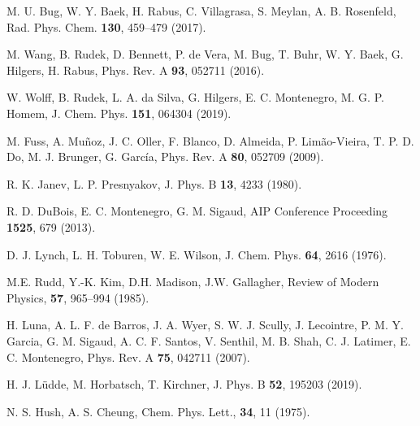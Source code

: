 \begin{thebibliography}{9}
M. U. Bug, W. Y. Baek, H. Rabus, C. Villagrasa, S. Meylan, A. B. Rosenfeld,
Rad. Phys. Chem. \textbf{130}, 459--479 (2017).

M. Wang, B. Rudek, D. Bennett, P. de Vera, M. Bug, T. Buhr, W. Y. Baek, 
G. Hilgers, H. Rabus, 
Phys. Rev. A \textbf{93}, 052711 (2016).

W. Wolff, B. Rudek, L. A. da Silva, G. Hilgers, E. C. Montenegro, 
M. G. P. Homem,
J. Chem. Phys. \textbf{151}, 064304 (2019).

M. Fuss, A. Muñoz, J. C. Oller, F. Blanco, D. Almeida, P. Limão-Vieira, 
T. P. D. Do, M. J. Brunger, G. Garc\'{i}a,
Phys. Rev. A \textbf{80}, 052709 (2009).

R. K. Janev, L. P. Presnyakov, 
J. Phys. B \textbf{13}, 4233 (1980).

R. D. DuBois, E. C. Montenegro, G. M. Sigaud,
AIP Conference Proceeding \textbf{1525}, 679 (2013).

D. J. Lynch, L. H. Toburen, W. E. Wilson,
J. Chem. Phys. \textbf{64}, 2616 (1976).

M.E. Rudd, Y.-K. Kim, D.H. Madison, J.W. Gallagher,
Review of Modern Physics, \textbf{57}, 965--994 (1985).

H. Luna, A. L. F. de Barros, J. A. Wyer, S. W. J. Scully, J. Lecointre, 
P. M. Y. Garcia, G. M. Sigaud, A. C. F. Santos, V. Senthil, M. B. Shah, 
C. J. Latimer, E. C. Montenegro,
Phys. Rev. A \textbf{75}, 042711 (2007).

H. J. L\"udde, M. Horbatsch, T. Kirchner,
J. Phys. B \textbf{52}, 195203 (2019).


N. S. Hush, A. S. Cheung,  
Chem. Phys. Lett., \textbf{34}, 11 (1975).


\end{thebibliography}
